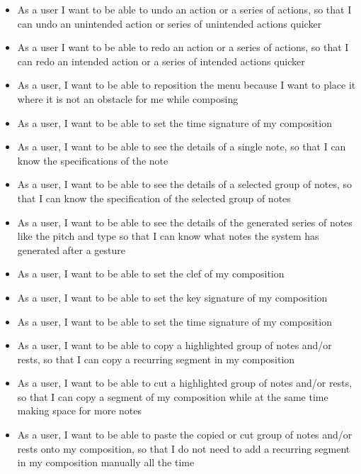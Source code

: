 \begin{itemize}
    \item As a user I want to be able to undo an action or a series of actions, so that I can undo an unintended action or series of unintended actions quicker
    \item As a user I want to be able to redo an action or a series of actions, so that I can redo an intended action or a series of intended actions quicker
    \item As a user, I want to be able to reposition the menu because I want to place it where it is not an obstacle for me while composing
    \item As a user, I want to be able to set the time signature of my composition
    \item As a user, I want to be able to see the details of a single note, so that I can know the specifications of the note
    \item As a user, I want to be able to see the details of a selected group of notes, so that I can know the specification of the selected group of notes
    \item As a user, I want to be able to see the details of the generated series of notes like the pitch and type so that I can know what notes the system has generated after a gesture
    \item As a user, I want to be able to set the clef of my composition
    \item As a user, I want to be able to set the key signature of my composition
    \item As a user, I want to be able to set the time signature of my composition
    \item As a user, I want to be able to copy a highlighted group of notes and/or rests, so that I can copy a recurring segment in my composition
    \item As a user, I want to be able to cut a highlighted group of notes and/or rests, so that I can copy a segment of my composition while at the same time making space for more notes
    \item As a user, I want to be able to paste the copied or cut group of notes and/or rests onto my composition, so that I do not need to add a recurring segment in my composition manually all the time

\end{itemize}
